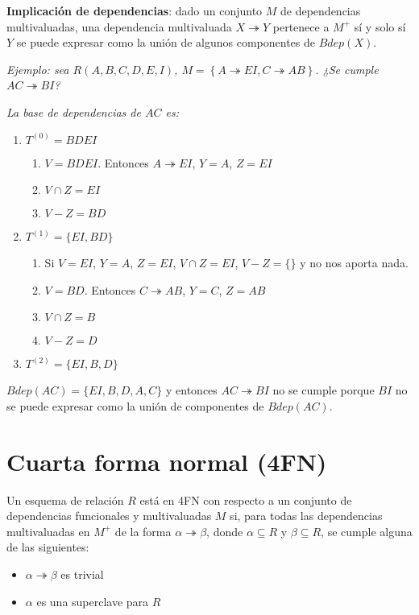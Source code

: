 \documentclass[a4paper, twoside]{article}
\begin{document}
\textbf{Implicación de dependencias}: dado un conjunto $M$ de dependencias multivaluadas, una dependencia multivaluada $X\twoheadrightarrow Y$ pertenece a $M^{+}$ sí y solo sí $Y$ se puede expresar como la unión
de algunos componentes de $Bdep(X)$.

\emph{Ejemplo: sea $R(A,B,C,D,E,I)$, $M=\left\{ A\twoheadrightarrow EI,C\twoheadrightarrow AB\right\} $. ¿Se cumple $AC\twoheadrightarrow BI$?}

\emph{La base de dependencias de $AC$ es:}
\begin{enumerate}
	\item $T^{(0)}=BDEI$
	\begin{enumerate}
		\item $V=BDEI$. Entonces $A\twoheadrightarrow EI$, $Y=A$, $Z=EI$
		\item $V\cap Z=EI$
		\item $V-Z=BD$
	\end{enumerate}
	\item $T^{(1)}=\{EI,BD\}$
	\begin{enumerate}
		\item Si $V=EI$, $Y=A$, $Z=EI$, $V\cap Z=EI$, $V-Z=\{\}$ y no nos aporta nada.
		\item $V=BD$. Entonces $C\twoheadrightarrow AB$, $Y=C$, $Z=AB$
		\item $V\cap Z=B$
		\item $V-Z=D$
	\end{enumerate}
	\item $T^{(2)}=\{EI,B,D\}$
\end{enumerate}

$Bdep(AC)=\{EI,B,D,A,C\}$ y entonces $AC\twoheadrightarrow BI$ no se cumple porque $BI$ no se puede expresar como la unión de componentes de $Bdep(AC)$.

\section{Cuarta forma normal (4FN)}
Un esquema de relación $R$ está en 4FN con respecto a un conjunto de dependencias funcionales y multivaluadas $M$ si, para todas las dependencias multivaluadas en $M^{+}$ de la forma $\alpha \twoheadrightarrow \beta$, donde $\alpha\subseteq R$ y $\beta\subseteq R$, se cumple alguna de las siguientes:
\begin{itemize}
	\item $\alpha\twoheadrightarrow\beta$ es trivial
	\item $\alpha$ es una superclave para $R$ 
\end{itemize}
\end{document}
